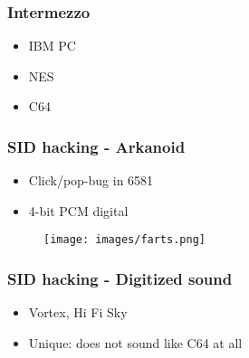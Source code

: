 
\begin{frame}
\frametitle{Intermezzo}

\begin{itemize}
\item IBM PC
\item NES
\item C64
\end{itemize}

\end{frame}


\begin{frame}
\frametitle{SID hacking - Arkanoid}

\begin{itemize}
\item Click/pop-bug in 6581
\item 4-bit PCM digital
\end{itemize}

\begin{figure}
\texttt{[image: images/farts.png]}
\end{figure}

\end{frame}


\begin{frame}
\frametitle{SID hacking - Digitized sound}

\begin{itemize}
\item Vortex, Hi Fi Sky
\item Unique: does not sound like C64 at all
\end{itemize}

\end{frame}
